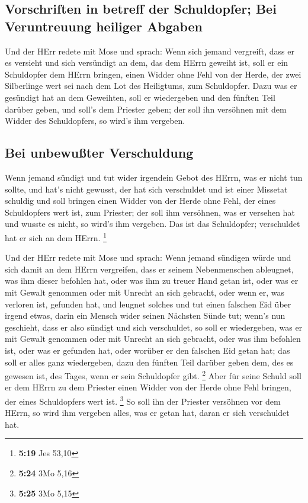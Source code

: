 \hypertarget{vorschriften-in-betreff-der-schuldopfer-bei-veruntreuung-heiliger-abgaben}{%
\subsection{Vorschriften in betreff der Schuldopfer; Bei Veruntreuung
heiliger
Abgaben}\label{vorschriften-in-betreff-der-schuldopfer-bei-veruntreuung-heiliger-abgaben}}

 Und der HErr redete mit Mose und sprach: 
Wenn sich jemand vergreift, dass er es versieht und sich versündigt an
dem, das dem HErrn geweiht ist, soll er ein Schuldopfer dem HErrn
bringen, einen Widder ohne Fehl von der Herde, der zwei Silberlinge wert
sei nach dem Lot des Heiligtums, zum Schuldopfer.  Dazu
was er gesündigt hat an dem Geweihten, soll er wiedergeben und den
fünften Teil darüber geben, und soll's dem Priester geben; der soll ihn
versöhnen mit dem Widder des Schuldopfers, so wird's ihm vergeben.

\hypertarget{bei-unbewuuxdfter-verschuldung}{%
\subsection{Bei unbewußter
Verschuldung}\label{bei-unbewuuxdfter-verschuldung}}

 Wenn jemand sündigt und tut wider irgendein Gebot des
HErrn, was er nicht tun sollte, und hat's nicht gewusst, der hat sich
verschuldet und ist einer Missetat schuldig  und soll
bringen einen Widder von der Herde ohne Fehl, der eines Schuldopfers
wert ist, zum Priester; der soll ihm versöhnen, was er versehen hat und
wusste es nicht, so wird's ihm vergeben.  Das ist das
Schuldopfer; verschuldet hat er sich an dem HErrn. \footnote{\textbf{5:19}
  Jes 53,10}

 Und der HErr redete mit Mose und sprach: 
Wenn jemand sündigen würde und sich damit an dem HErrn vergreifen, dass
er seinem Nebenmenschen ableugnet, was ihm dieser befohlen hat, oder was
ihm zu treuer Hand getan ist, oder was er mit Gewalt genommen oder mit
Unrecht an sich gebracht,  oder wenn er, was verloren
ist, gefunden hat, und leugnet solches und tut einen falschen Eid über
irgend etwas, darin ein Mensch wider seinen Nächsten Sünde tut;
 wenn's nun geschieht, dass er also sündigt und sich
verschuldet, so soll er wiedergeben, was er mit Gewalt genommen oder mit
Unrecht an sich gebracht, oder was ihm befohlen ist, oder was er
gefunden hat,  oder worüber er den falschen Eid getan
hat; das soll er alles ganz wiedergeben, dazu den fünften Teil darüber
geben dem, des es gewesen ist, des Tages, wenn er sein Schuldopfer gibt.
\footnote{\textbf{5:24} 3Mo 5,16}  Aber für seine Schuld
soll er dem HErrn zu dem Priester einen Widder von der Herde ohne Fehl
bringen, der eines Schuldopfers wert ist. \footnote{\textbf{5:25} 3Mo
  5,15}  So soll ihn der Priester versöhnen vor dem
HErrn, so wird ihm vergeben alles, was er getan hat, daran er sich
verschuldet hat.

